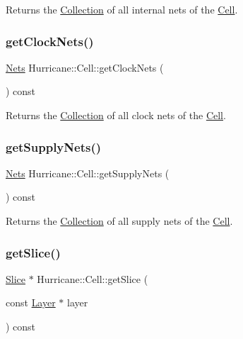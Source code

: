 Returns the \mbox{\hyperlink{classHurricane_1_1Collection}{Collection}} of all internal nets of the \mbox{\hyperlink{classHurricane_1_1Cell}{Cell}}. \mbox{\label{classHurricane_1_1Cell_a306f28990f9fd4ccee0e9e8ebecf98fc}} 
\subsubsection{\texorpdfstring{get\+Clock\+Nets()}{getClockNets()}}
{\footnotesize\ttfamily \mbox{\hyperlink{namespaceHurricane_a3404a8b17130a1824f4a281704b04df7}{Nets}} Hurricane\+::\+Cell\+::get\+Clock\+Nets (\begin{DoxyParamCaption}{ }\end{DoxyParamCaption}) const}

Returns the \mbox{\hyperlink{classHurricane_1_1Collection}{Collection}} of all clock nets of the \mbox{\hyperlink{classHurricane_1_1Cell}{Cell}}. \mbox{\label{classHurricane_1_1Cell_ac51c8f16de7a4af86feead9f1aecf494}} 
\subsubsection{\texorpdfstring{get\+Supply\+Nets()}{getSupplyNets()}}
{\footnotesize\ttfamily \mbox{\hyperlink{namespaceHurricane_a3404a8b17130a1824f4a281704b04df7}{Nets}} Hurricane\+::\+Cell\+::get\+Supply\+Nets (\begin{DoxyParamCaption}{ }\end{DoxyParamCaption}) const}

Returns the \mbox{\hyperlink{classHurricane_1_1Collection}{Collection}} of all supply nets of the \mbox{\hyperlink{classHurricane_1_1Cell}{Cell}}. \mbox{\label{classHurricane_1_1Cell_ac438b5b6b8dbcd868d6bf0deeb469444}} 
\subsubsection{\texorpdfstring{get\+Slice()}{getSlice()}}
{\footnotesize\ttfamily \mbox{\hyperlink{classHurricane_1_1Slice}{Slice}} $\ast$ Hurricane\+::\+Cell\+::get\+Slice (\begin{DoxyParamCaption}\item[{const \mbox{\hyperlink{classHurricane_1_1Layer}{Layer}} $\ast$}]{layer }\end{DoxyParamCaption}) const\hspace{0.3cm}{\ttfamily [inline]}}

